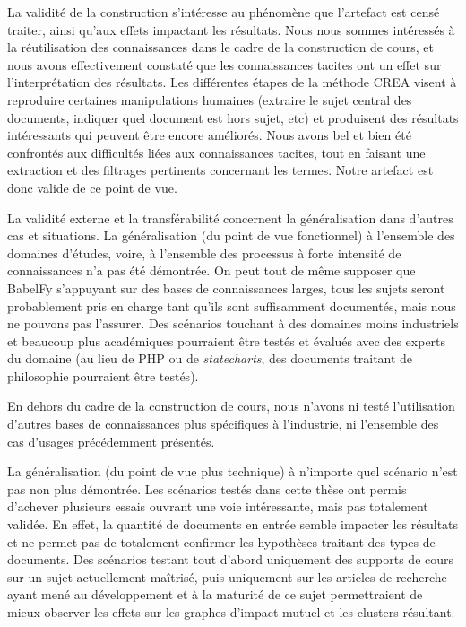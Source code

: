 \bigskip

La validité de la construction s'intéresse au phénomène que l'artefact est censé traiter, ainsi qu'aux effets impactant les résultats.
Nous nous sommes intéressés à la réutilisation des connaissances dans le cadre de la construction de cours, et nous avons effectivement constaté que les connaissances tacites ont un effet sur l'interprétation des résultats.
Les différentes étapes de la méthode CREA visent à reproduire certaines manipulations humaines (extraire le sujet central des documents, indiquer quel document est hors sujet, etc) et produisent des résultats intéressants qui peuvent être encore améliorés.
Nous avons bel et bien été confrontés aux difficultés liées aux connaissances tacites, tout en faisant une extraction et des filtrages pertinents concernant les termes.
Notre artefact est donc valide de ce point de vue.

\bigskip

La validité externe et la transférabilité concernent la généralisation dans d'autres cas et situations.
La généralisation (du point de vue fonctionnel) à l'ensemble des domaines d'études, voire, à l'ensemble des processus à forte intensité de connaissances n'a pas été démontrée.
On peut tout de même supposer que BabelFy s'appuyant sur des bases de connaissances larges, tous les sujets seront probablement pris en charge tant qu'ils sont suffisamment documentés, mais nous ne pouvons pas l'assurer.
Des scénarios touchant à des domaines moins industriels et beaucoup plus académiques pourraient être testés et évalués avec des experts du domaine (au lieu de PHP ou de \textit{statecharts}, des documents traitant de philosophie pourraient être testés).

En dehors du cadre de la construction de cours, nous n'avons ni testé l'utilisation d'autres bases de connaissances plus spécifiques à l'industrie, ni l'ensemble des cas d'usages précédemment présentés.

\bigskip

La généralisation (du point de vue plus technique) à n'importe quel scénario n'est pas non plus démontrée.
Les scénarios testés dans cette thèse ont permis d'achever plusieurs essais ouvrant une voie intéressante, mais pas totalement validée.
En effet, la quantité de documents en entrée semble impacter les résultats et ne permet pas de totalement confirmer les hypothèses traitant des types de documents.
Des scénarios testant tout d'abord uniquement des supports de cours sur un sujet actuellement maîtrisé, puis uniquement sur les articles de recherche ayant mené au développement et à la maturité de ce sujet permettraient de mieux observer les effets sur les graphes d'impact mutuel et les clusters résultant.

